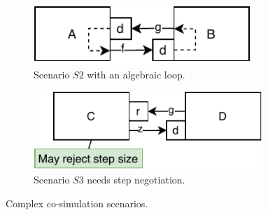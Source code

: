 \begin{figure}[htb]
  \begin{subfigure}{0.48\textwidth}
    \centering
    \centering
    \includegraphics[width=0.9\textwidth]{images/scenario_algebraic.pdf}
    \caption{Scenario $S2$ with an algebraic loop.}
    \label{fig:algebraic_example}
  \end{subfigure}
  \begin{subfigure}{.48\textwidth}
    \centering
    \includegraphics[width=0.95\textwidth]{images/step_negotiation_scenario.pdf}
    \caption{Scenario $S3$ needs step negotiation.}
    \label{fig:step_finding_scenario}
    \end{subfigure} 
    \caption{Complex co-simulation scenarios.}
    \vspace{-2em}

  \end{figure}


